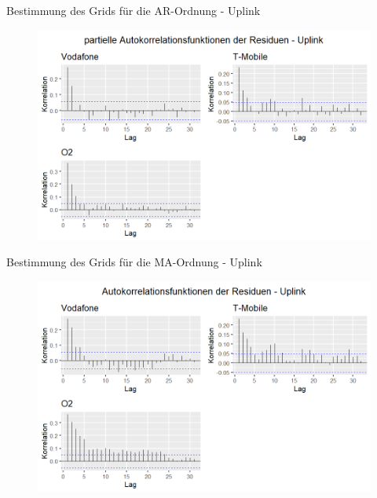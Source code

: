 \begin{frame}{Bestimmung des Grids für die AR-Ordnung - Uplink}
		\begin{figure}
			\includegraphics[scale=0.42]{plots/arima/uplink/res_pacf}\\
			\label{res_pacf_ul}
		\end{figure}
\end{frame}

\begin{frame}{Bestimmung des Grids für die MA-Ordnung - Uplink}
		\begin{figure}
			\includegraphics[scale=0.42]{plots/arima/uplink/res_acf}\\
			\label{res_acf_ul}
		\end{figure}
\end{frame}

